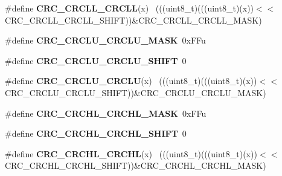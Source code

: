 \begin{DoxyCompactItemize}
\item 
\hypertarget{group___c_r_c___register___masks_ga72310ff587461fb7b7cabd47dbf6f011}{}\#define {\bfseries C\+R\+C\+\_\+\+C\+R\+C\+L\+L\+\_\+\+C\+R\+C\+L\+L}(x)                                          ~(((uint8\+\_\+t)(((uint8\+\_\+t)(x))$<$$<$C\+R\+C\+\_\+\+C\+R\+C\+L\+L\+\_\+\+C\+R\+C\+L\+L\+\_\+\+S\+H\+I\+F\+T))\&C\+R\+C\+\_\+\+C\+R\+C\+L\+L\+\_\+\+C\+R\+C\+L\+L\+\_\+\+M\+A\+S\+K)\label{group___c_r_c___register___masks_ga72310ff587461fb7b7cabd47dbf6f011}

\item 
\hypertarget{group___c_r_c___register___masks_ga22c6c03d914f327f64b73db15a230e0e}{}\#define {\bfseries C\+R\+C\+\_\+\+C\+R\+C\+L\+U\+\_\+\+C\+R\+C\+L\+U\+\_\+\+M\+A\+S\+K}~0x\+F\+Fu\label{group___c_r_c___register___masks_ga22c6c03d914f327f64b73db15a230e0e}

\item 
\hypertarget{group___c_r_c___register___masks_ga2104183fd4edfba092c04579a6a3bfa7}{}\#define {\bfseries C\+R\+C\+\_\+\+C\+R\+C\+L\+U\+\_\+\+C\+R\+C\+L\+U\+\_\+\+S\+H\+I\+F\+T}~0\label{group___c_r_c___register___masks_ga2104183fd4edfba092c04579a6a3bfa7}

\item 
\hypertarget{group___c_r_c___register___masks_ga08b9a64edea1c60eb0c96728b38959bc}{}\#define {\bfseries C\+R\+C\+\_\+\+C\+R\+C\+L\+U\+\_\+\+C\+R\+C\+L\+U}(x)                                          ~(((uint8\+\_\+t)(((uint8\+\_\+t)(x))$<$$<$C\+R\+C\+\_\+\+C\+R\+C\+L\+U\+\_\+\+C\+R\+C\+L\+U\+\_\+\+S\+H\+I\+F\+T))\&C\+R\+C\+\_\+\+C\+R\+C\+L\+U\+\_\+\+C\+R\+C\+L\+U\+\_\+\+M\+A\+S\+K)\label{group___c_r_c___register___masks_ga08b9a64edea1c60eb0c96728b38959bc}

\item 
\hypertarget{group___c_r_c___register___masks_ga069f960b90fdbfcfdd0296206592c1b0}{}\#define {\bfseries C\+R\+C\+\_\+\+C\+R\+C\+H\+L\+\_\+\+C\+R\+C\+H\+L\+\_\+\+M\+A\+S\+K}~0x\+F\+Fu\label{group___c_r_c___register___masks_ga069f960b90fdbfcfdd0296206592c1b0}

\item 
\hypertarget{group___c_r_c___register___masks_ga0acc1b8a3ef9b7c723d2323af4c20ca4}{}\#define {\bfseries C\+R\+C\+\_\+\+C\+R\+C\+H\+L\+\_\+\+C\+R\+C\+H\+L\+\_\+\+S\+H\+I\+F\+T}~0\label{group___c_r_c___register___masks_ga0acc1b8a3ef9b7c723d2323af4c20ca4}

\item 
\hypertarget{group___c_r_c___register___masks_gacc352c93802acc0445df3e47f99288ad}{}\#define {\bfseries C\+R\+C\+\_\+\+C\+R\+C\+H\+L\+\_\+\+C\+R\+C\+H\+L}(x)                                          ~(((uint8\+\_\+t)(((uint8\+\_\+t)(x))$<$$<$C\+R\+C\+\_\+\+C\+R\+C\+H\+L\+\_\+\+C\+R\+C\+H\+L\+\_\+\+S\+H\+I\+F\+T))\&C\+R\+C\+\_\+\+C\+R\+C\+H\+L\+\_\+\+C\+R\+C\+H\+L\+\_\+\+M\+A\+S\+K)\label{group___c_r_c___register___masks_gacc352c93802acc0445df3e47f99288ad}


\end{DoxyCompactItemize}
